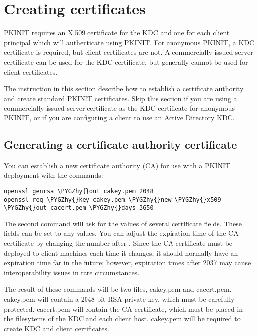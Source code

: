\documentclass[letterpaper,10pt,english]{sphinxmanual}
\def\PYGZhy{\char`\-}
\begin{document}
\section{Creating certificates}
\label{admin/pkinit:creating-certificates}
PKINIT requires an X.509 certificate for the KDC and one for each
client principal which will authenticate using PKINIT.  For anonymous
PKINIT, a KDC certificate is required, but client certificates are
not.  A commercially issued server certificate can be used for the KDC
certificate, but generally cannot be used for client certificates.

The instruction in this section describe how to establish a
certificate authority and create standard PKINIT certificates.  Skip
this section if you are using a commercially issued server certificate
as the KDC certificate for anonymous PKINIT, or if you are configuring
a client to use an Active Directory KDC.


\subsection{Generating a certificate authority certificate}
\label{admin/pkinit:generating-a-certificate-authority-certificate}
You can establish a new certificate authority (CA) for use with a
PKINIT deployment with the commands:

\begin{Verbatim}[commandchars=\\\{\}]
openssl genrsa \PYGZhy{}out cakey.pem 2048
openssl req \PYGZhy{}key cakey.pem \PYGZhy{}new \PYGZhy{}x509 \PYGZhy{}out cacert.pem \PYGZhy{}days 3650
\end{Verbatim}

The second command will ask for the values of several certificate
fields.  These fields can be set to any values.  You can adjust the
expiration time of the CA certificate by changing the number after
.  Since the CA certificate must be deployed to client
machines each time it changes, it should normally have an expiration
time far in the future; however, expiration times after 2037 may cause
interoperability issues in rare circumstances.

The result of these commands will be two files, cakey.pem and
cacert.pem.  cakey.pem will contain a 2048-bit RSA private key, which
must be carefully protected.  cacert.pem will contain the CA
certificate, which must be placed in the filesytems of the KDC and
each client host.  cakey.pem will be required to create KDC and client
certificates.
\end{document}

